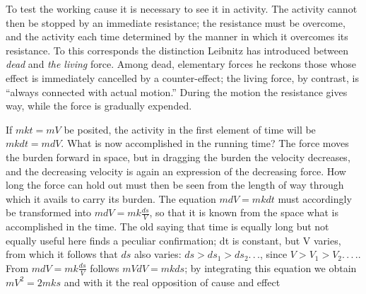 \documentclass[12pt,a4paper]{book}
\begin{document}
To test the working cause it is necessary to see it in activity. The activity cannot then
be stopped by an immediate resistance; the resistance must be overcome, and the activity
each time determined by the manner in which it overcomes its resistance. To this
corresponds the distinction Leibnitz has introduced between
\emph{dead} and \emph{the living} force. Among dead, elementary forces he reckons those
whose effect is immediately cancelled by a counter-effect; the living force, by contrast,
is ``always connected with actual motion.'' During the motion the resistance gives way,
while the force is gradually expended.

If $mkt = mV$ be posited, the activity in the first element of time will be $mkdt = mdV$.
What is now accomplished in the running time? The force moves the burden forward in space,
but in dragging the burden the velocity decreases, and the decreasing velocity is again an
expression of the decreasing force. How long the force can hold out must then be seen from
the length of way through which it avails to carry its burden. The equation $mdV = mkdt$
must accordingly be transformed into $mdV = mk\frac{ds}{V}$,
so that it is known from the space what is accomplished in the time. The old saying that
time is equally long but not equally useful here finds a peculiar confirmation; dt is
constant, but V varies, from which it follows that $ds$ also
varies: $ds > ds_{1} > ds_{2} .\,.\,.$, since $V > V_{1} > V_{2}
.\,.\,.\,.$. From $mdV = mk\frac{ds}{V}$ follows $mVdV = mkds$; by integrating this equation
we obtain $mV^{2} = 2mks$ and with it the real opposition of cause and effect
\end{document}
